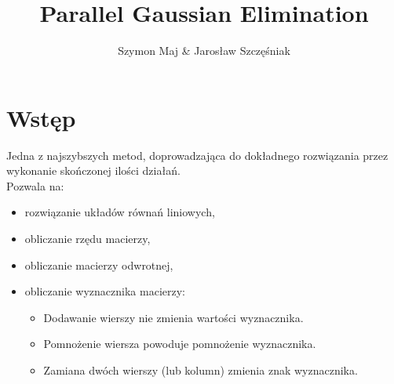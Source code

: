 \documentclass{beamer}
\title{Parallel Gaussian Elimination}
\author{Szymon Maj \& Jarosław Szczęśniak}
\institute{Akademia Górniczo-Hutnicza im. Stanisława Staszica w Krakowie}
\begin{document}
	\begin{frame}
		\titlepage
	\end{frame}

	\section{Wstęp}
	\begin{frame}
		Jedna z najszybszych metod, doprowadzająca do dokładnego rozwiązania przez wykonanie skończonej ilości działań.
		\newline \\
		Pozwala na:
		\begin{itemize}
			\item rozwiązanie układów równań liniowych,
			\item obliczanie rzędu macierzy,
			\item obliczanie macierzy odwrotnej,
			\item obliczanie wyznacznika macierzy:
				\begin{itemize}
					\item Dodawanie wierszy nie zmienia wartości wyznacznika.
					\item Pomnożenie wiersza powoduje pomnożenie wyznacznika.
					\item Zamiana dwóch wierszy (lub kolumn) zmienia znak wyznacznika.
				\end{itemize}
		\end{itemize}
	\end{frame}
	
\end{document}
